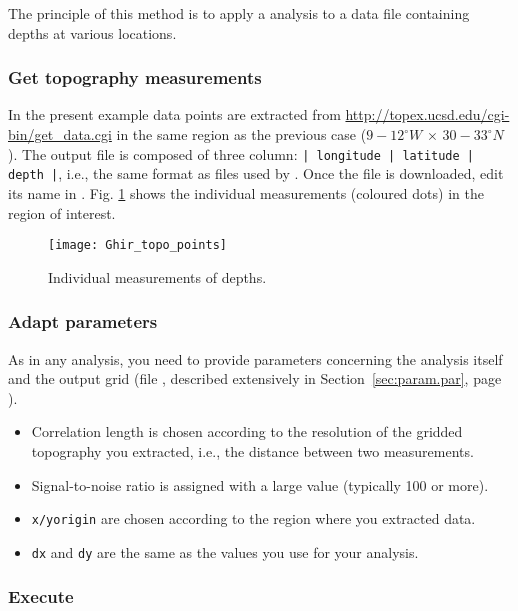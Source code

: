 The principle of this method is to apply a \diva analysis to a data file containing depths at various locations.

\subsubsection{Get topography measurements}

In the present example data points are extracted from \url{http://topex.ucsd.edu/cgi-bin/get_data.cgi} in the same region as the previous case ($9-12^{\circ}W\, \times\, 30-33^{\circ}N$). The output file is composed of three column: \texttt{| longitude | latitude | depth |}, i.e., the same format as  files used by \diva. Once the file is downloaded, edit its name in . Fig. \ref{fig:guirtopo} shows the individual measurements (coloured dots) in the region of interest. 


\begin{figure}[htpb]
\centering
\texttt{[image: Ghir\_topo\_points]}
\caption{Individual measurements of depths.\label{fig:guirtopo}}
\end{figure}


\subsubsection{Adapt parameters}

As in any \diva analysis, you need to provide parameters concerning the analysis itself and the output grid (file , described extensively in Section~\ref{sec:param.par}, page \pageref{sec:param.par}). 

\begin{itemize}
\item Correlation length is chosen according to the resolution of the gridded topography you extracted, i.e., the distance between two measurements.
\item Signal-to-noise ratio is assigned with a large value (typically 100 or more).
\item \texttt{x/yorigin} are chosen according to the region where you extracted data.
\item \texttt{dx} and \texttt{dy} are the same as the values you use for your analysis. 
\end{itemize}



\subsubsection{Execute }

